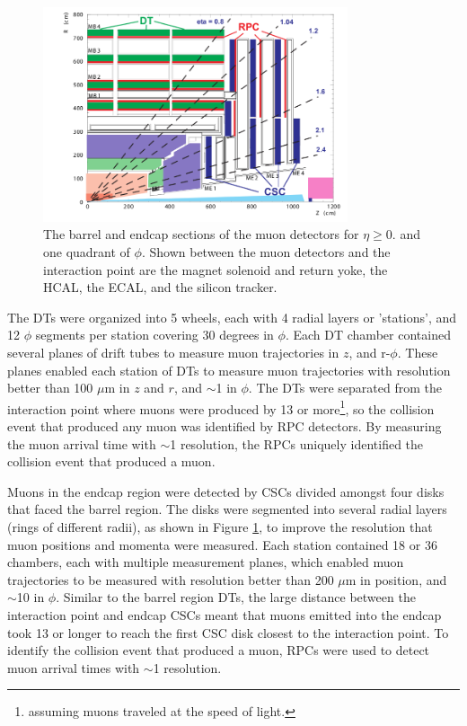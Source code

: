 \begin{figure}[ht]
	\centering
	\includegraphics[width=0.8\textwidth]{figures/muonDetectorLayout.png}
	\caption{The barrel and endcap sections of the muon detectors for $\eta \geq 0.$ and one quadrant of $\phi$.  Shown 
		between the muon detectors and the interaction point are the magnet solenoid and return yoke, the HCAL, the ECAL, 
		and the silicon tracker.}
	\label{fig:muonBarrelAndEndcapDetectors}
\end{figure}


The DTs were organized into 5 wheels, each with 4 radial layers or 'stations', and 12 $\phi$ segments per 
station covering 30 degrees in $\phi$.  Each DT chamber contained several planes of drift tubes to measure 
muon trajectories in $z$, and r-$\phi$.  These planes enabled each station of DTs to measure muon trajectories 
with resolution better than 100 $\mu$m in $z$ and $r$, and $\sim$1 \mrad in $\phi$.  The DTs were separated 
from the interaction point where muons were produced by 13 \ns or more\footnote{assuming muons traveled at the speed 
of light.}, so the collision event that produced any muon was identified by RPC detectors.  By measuring 
the muon arrival time with $\sim$1 \ns resolution, the RPCs uniquely identified the collision event that 
produced a muon.

Muons in the endcap region were detected by CSCs divided amongst four disks that faced the barrel region.  
The disks were segmented into several radial layers (rings of different radii), as shown in Figure \ref{fig:muonBarrelAndEndcapDetectors}, 
to improve the resolution that muon positions and momenta were measured.  Each station contained 18 or 36 
chambers, each with multiple measurement planes, which enabled muon trajectories to be measured with resolution 
better than 200 $\mu$m in position, and $\sim$10 \mrad in $\phi$.  Similar to the barrel region DTs, the large distance between the interaction 
point and endcap CSCs meant that muons emitted into the endcap took 13 \ns or longer to reach the first CSC 
disk closest to the interaction point.  To identify the collision event that produced a muon, RPCs were used 
to detect muon arrival times with $\sim$1 \ns resolution.


